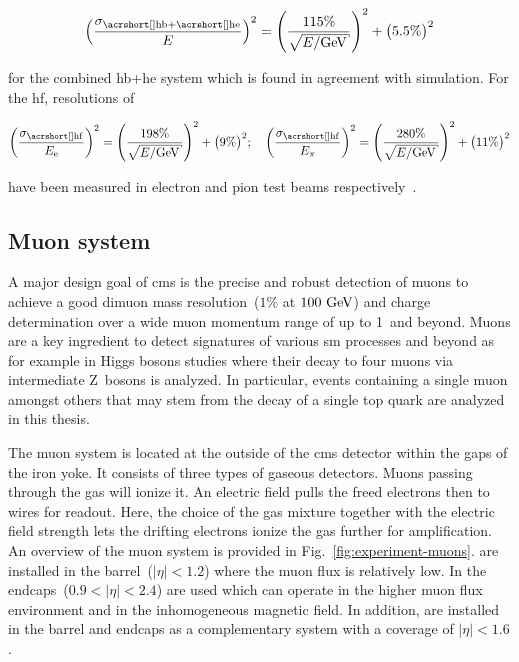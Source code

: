 \begin{equation}
\left(\frac{\sigma_\mathrm{\gls{hb}+\gls{he}}}{E}\right)^{2}=\left(\frac{115\%}{\sqrt{E/\GeV}}\right)^{2}+\big(5.5\%\big)^{2}
\end{equation}

for the combined \gls{hb}+\gls{he} system which is found in agreement with simulation. For the \gls{hf}, resolutions of

\begin{equation}
\left(\frac{\sigma_\mathrm{\gls{hf}}}{E_\mathrm{e}}\right)^{2}=\left(\frac{198\%}{\sqrt{E/\GeV}}\right)^{2}+\big(9\%\big)^{2};\quad \left(\frac{\sigma_\mathrm{\gls{hf}}}{E_{\pi}}\right)^{2}=\left(\frac{280\%}{\sqrt{E/\GeV}}\right)^{2}+\big(11\%\big)^{2}
\end{equation}

have been measured in electron and pion test beams respectively~\cite{Bayatian:2006jz}.



\subsection{Muon system}
\label{sec:experiment-muon-systems}

A major design goal of \gls{cms} is the precise and robust detection of muons to achieve a good dimuon mass resolution~($1\%$ at $100~\textrm{GeV}$) and charge determination over a wide muon momentum range of up to 1~\TeV and beyond. Muons are a key ingredient to detect signatures of various \gls{sm} processes and beyond as for example in Higgs bosons studies where their decay to four muons via intermediate Z~bosons is analyzed. In particular, events containing a single muon amongst others that may stem from the decay of a single top quark are analyzed in this thesis.

The muon system is located at the outside of the \gls{cms} detector within the gaps of the iron yoke. It consists of three types of gaseous detectors. Muons passing through the gas will ionize it. An electric field pulls the freed electrons then to wires for readout. Here, the choice of the gas mixture together with the electric field strength lets the drifting electrons ionize the gas further for amplification. An overview of the muon system is provided in Fig.~\ref{fig:experiment-muons}.  are installed in the barrel~($|\eta|<1.2$) where the muon flux is relatively low. In the endcaps~($0.9<|\eta|<2.4$)  are used which can operate in the higher muon flux environment and in the inhomogeneous magnetic field. In addition,  are installed in the barrel and endcaps as a complementary system with a coverage of $|\eta|<1.6$.

